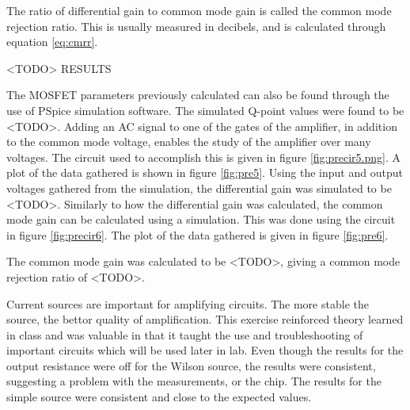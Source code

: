 The ratio of differential gain to common mode gain is called the common mode rejection ratio. This is usually measured in decibels, and is calculated through equation \ref{eq:cmrr}.

<TODO> RESULTS

The MOSFET parameters previously calculated can also be found through the use of PSpice simulation software. The simulated Q-point values were found to be <TODO>. 
Adding an AC signal to one of the gates of the amplifier, in addition to the common mode voltage, enables the study of the amplifier over many voltages. The circuit used to accomplish this is given in figure \ref{fig:precir5.png}.
A plot of the data gathered is shown in figure \ref{fig:pre5}.
Using the input and output voltages gathered from the simulation, the differential gain was simulated to be <TODO>. 
Similarly to how the differential gain was calculated, the common mode gain can be calculated using a simulation. This was done using the circuit in figure \ref{fig:precir6}. The plot of the data gathered is given in figure \ref{fig:pre6}. 

The common mode gain was calculated to be <TODO>, giving a common mode rejection ratio of <TODO>. 


Current sources are important for amplifying circuits. The more stable the source, the bettor quality of amplification. This exercise reinforced theory learned in class and was valuable in that it taught the use and troubleshooting of important circuits which will be used later in lab. 
Even though the results for the output resistance were off for the Wilson source, the results were consistent, suggesting a problem with the measurements, or the chip. 
The results for the simple source were consistent and close to the expected values. 



